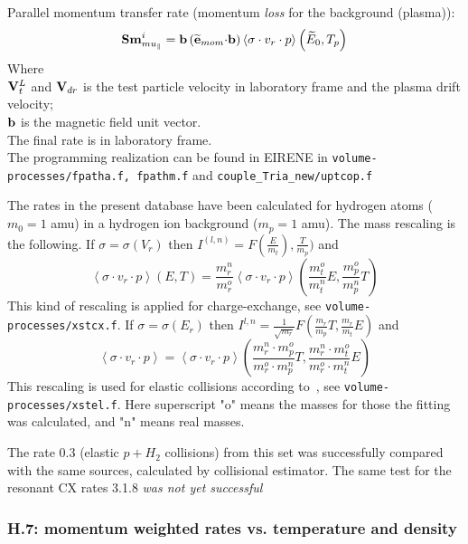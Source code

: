 \documentclass[12pt,dvipdfmx]{article}
\begin{document}
Parallel momentum transfer rate (momentum {\em loss} for the background (plasma)):
$$
{\bf Sm}^i_{mu_\parallel}= {\bf b} \left(\widetilde{{\bf e}}_{mom}{\bf\cdot}{\bf b}\right) \left<\sigma\cdot v_r\cdot p\right>
\left(\widetilde{E}_0 ,T_p\right)
$$
Where\\
${\bf V}^L_t$ and ${\bf V}_{dr}$ is the test particle velocity in laboratory frame and the plasma drift velocity;\\

${\bf b}$ is the magnetic field unit vector.\\
The final rate is in laboratory frame.\\
The programming realization can be found in EIRENE in {\tt volume-processes/fpatha.f, fpathm.f} and {\tt couple\_Tria\_new/uptcop.f}

The rates in the present database have been calculated for hydrogen atoms ($m_0=1$ amu) in a hydrogen ion background ($m_p=1$ amu). The mass rescaling is the following.
If $\sigma=\sigma(V_r)$ then $I^{(l,n)}=F\left(\frac{E}{m_t}\right),\frac{T}{m_p})$ and
$$\left<\sigma\cdot v_r\cdot p\right>(E,T)=\frac{m^n_r}{m^o_r}
\left<\sigma\cdot v_r\cdot p\right>(\frac{m^o_t}{m^n_t}E,\frac{m^o_p}{m^n_p}T)$$
This kind of rescaling is applied for charge-exchange, see {\tt volume-processes/xstcx.f}.
If $\sigma=\sigma(E_r)$ then $I^{l,n}=\frac{1}{\sqrt{m_r}}F\left(\frac{m_r}{m_p}T, \frac{m_r}{m_t}E\right)$ and
$$\left<\sigma\cdot v_r\cdot p\right>=\left<\sigma\cdot v_r\cdot p\right>\left(\frac{m^n_r\cdot m^o_p}{m^o_r\cdot m^n_p}T,\frac{m^n_r\cdot m^o_t}{m^o_r\cdot m^n_t}E\right)$$
This rescaling is used for elastic collisions according to~\cite{kn:OakRidge}, see {\tt volume-processes/xstel.f}. Here superscript "o" means the masses for those the fitting was calculated, and "n" means real masses.

The rate 0.3 (elastic $p+H_2$ collisions) from this set was successfully compared with the same sources, calculated by collisional estimator. The same test for the resonant CX rates 3.1.8  {\em was not yet successful}
\subsubsection{H.7: momentum weighted rates vs. temperature and density}\label{sec1.3.7}
\end{document}

